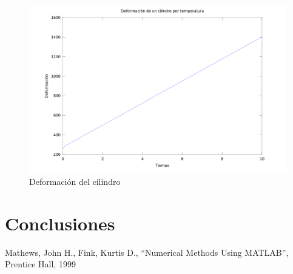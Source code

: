 \documentclass[journal, monochrome]{IEEEtran}
\begin{document}
\begin{figure}
	\centering
	\includegraphics[scale = 0.25]{img/graph_e.png}
	\caption{Deformación del cilindro}
	\label{figure:histograms}
\end{figure}



\vspace{1cm}
\section{Conclusiones}
\label{section:conclusions}
\vspace{0.5cm}




\vspace{1cm}
\begin{thebibliography}{1}
	Mathews, John H.,
	Fink, Kurtis D.,
	``Numerical Methods Using MATLAB'',
	Prentice Hall,
	1999
	
\end{thebibliography}




\begin{figure}
	
\end{figure}

\end{document}
